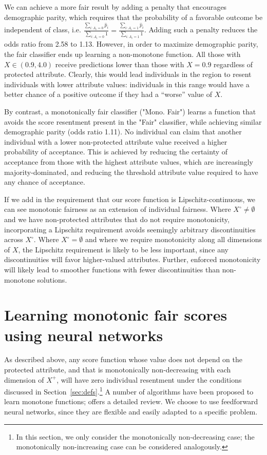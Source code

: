     We can achieve a more fair result by adding a penalty that encourages demographic parity\cite{HarPriSre2016}, which requires that the probability of a favorable outcome be independent of class, i.e. 
     $\frac{\sum_{i: A_i = 0} \hat{p}_i}{\sum_{i: A_i = 0} 1} = \frac{\sum_{i: A_i = 1} \hat{p}_i}{\sum_{i: A_i = 1} 1}$.  Adding such a penalty reduces the odds ratio from 2.58 to 1.13.
    However, in order to maximize demographic parity, the fair classifier ends up learning a non-monotone function. All those with $X \in (0.9, 4.0)$ receive predictions lower than those with $X = 0.9$ regardless of protected attribute. Clearly, this would lead individuals in the region to resent individuals with lower attribute values: individuals in this range would have a better chance of a positive outcome if they had a ``worse'' value of $X$.
        
    By contrast, a monotonically fair classifier ("Mono. Fair") learns a function that avoids the score resentment present in the "Fair" classifier, while achieving similar demographic parity (odds ratio 1.11). No individual can claim that another individual with a lower non-protected attribute value received a higher probability of acceptance.  This is achieved by reducing the certainty of acceptance from those with the highest attribute values, which are increasingly majority-dominated, and reducing the threshold attribute value required to have any chance of acceptance. 
    
    If we add in the requirement that our score function is Lipschitz-continuous, we can see monotonic fairness as an extension of individual fairness. Where $X^\circ \neq \emptyset$ and we have non-protected attributes that do not require monotonicity, incorporating a Lipschitz requirement avoids seemingly arbitrary discontinuities across $X^\circ$. Where $X^\circ = \emptyset$ and where we require monotonicity along all dimensions of $X$, the Lipschitz requirement is likely to be less important, since any discontinuities will favor higher-valued attributes. Further, enforced monotonicity will likely lead to smoother functions with fewer discontinuities than non-monotone solutions.
    
\section{Learning monotonic fair scores using neural networks}
    
    As described above, any score function whose value does not depend on the protected attribute, and that is monotonically non-decreasing with each dimension of $X^+$, will have zero individual resentment under the conditions discussed in Section~\ref{sec:defs}.\footnote{In this section, we only consider the monotonically non-decreasing case; the monotonically non-increasing case can be considered analogously.} A number of algorithms have been proposed to learn monotone functions; \cite{cano2019monotonic} offers a detailed review. We choose to use feedforward neural networks, since they are flexible and easily adapted to a specific problem.
    

